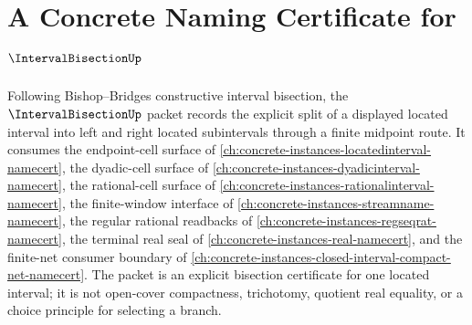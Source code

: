 \chapter{A Concrete Naming Certificate for $\IntervalBisectionUp$}
\label{ch:concrete-instances-intervalbisection-namecert}

Following Bishop--Bridges constructive interval bisection, the $\IntervalBisectionUp$ packet records the explicit split of a displayed located interval into left and right located subintervals through a finite midpoint route. It consumes the endpoint-cell surface of \autoref{ch:concrete-instances-locatedinterval-namecert}, the dyadic-cell surface of \autoref{ch:concrete-instances-dyadicinterval-namecert}, the rational-cell surface of \autoref{ch:concrete-instances-rationalinterval-namecert}, the finite-window interface of \autoref{ch:concrete-instances-streamname-namecert}, the regular rational readbacks of \autoref{ch:concrete-instances-regseqrat-namecert}, the terminal real seal of \autoref{ch:concrete-instances-real-namecert}, and the finite-net consumer boundary of \autoref{ch:concrete-instances-closed-interval-compact-net-namecert}. The packet is an explicit bisection certificate for one located interval; it is not open-cover compactness, trichotomy, quotient real equality, or a choice principle for selecting a branch.

